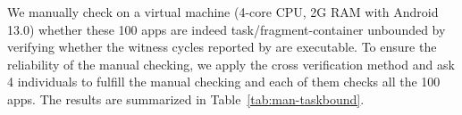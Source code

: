 
We manually check on a virtual machine (4-core CPU, 2G RAM with Android 13.0) whether these 100 apps are indeed task/fragment-container unbounded by verifying whether the witness cycles reported by {\tool} are executable. To ensure the reliability of the manual checking, we apply the cross verification method and ask 4 individuals to fulfill the manual checking and each of them checks all the 100 apps. 
The results are summarized in Table~\ref{tab:man-taskbound}.

